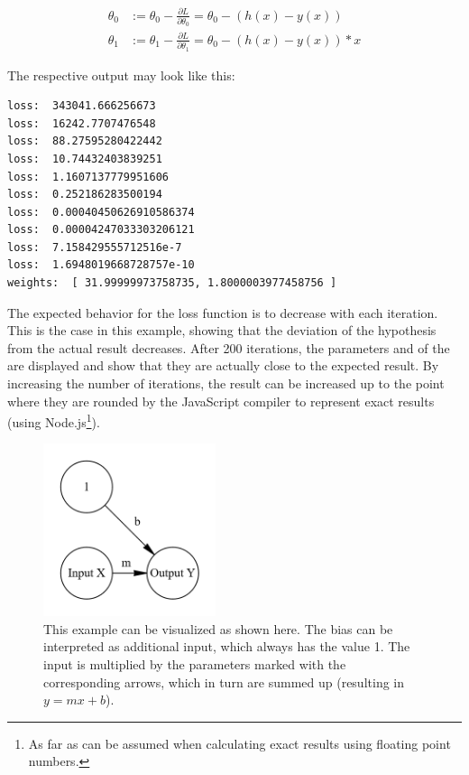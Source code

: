 \begin{equation}
    \begin{split}
        \theta_{0} & := \theta_{0} - \frac{\partial L}{\partial \theta_{0}} =
        \theta_{0} - (h(x) - y(x))  \\
        \theta_{1} & := \theta_{1} - \frac{\partial L}{\partial \theta_{1}} =
        \theta_{0} - (h(x) - y(x)) * x
    \end{split}
    \label{eq:sgd_mse_here}
\end{equation}

The respective output may look like this:
\begin{lstlisting}
loss:  343041.666256673
loss:  16242.7707476548
loss:  88.27595280422442
loss:  10.74432403839251
loss:  1.1607137779951606
loss:  0.252186283500194
loss:  0.00040450626910586374
loss:  0.00004247033303206121
loss:  7.158429555712516e-7
loss:  1.6948019668728757e-10
weights:  [ 31.99999973758735, 1.8000003977458756 ]
\end{lstlisting} 

The expected behavior for the loss function is to decrease with each iteration.
This is the case in this example, showing that the deviation of the hypothesis from the actual result decreases.
After 200 iterations, the parameters  and  of the  are displayed and show that they are actually close to the expected result.
By increasing the number of iterations, the result can be increased up to the point where they are rounded by the JavaScript compiler to represent exact results (using Node.js\footnote{As far as can be assumed when calculating exact results using floating point numbers.}).

\begin{figure}
    \centering
    \caption{This example can be visualized as shown here. The bias can be interpreted as additional input, which always has the value 1. The input is multiplied by the parameters marked with the corresponding arrows, which in turn are summed up (resulting in $y = mx + b$).}
    \includegraphics[width=0.45\textwidth]{images/1_simplest_nn.png}
\end{figure} 

